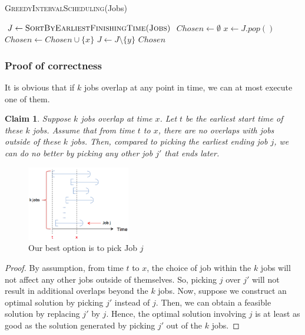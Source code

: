\documentclass[12pt, a4paper]{report}
\newtheorem{claim}{Claim}
\begin{document}
\begin{algorithm}[h!]
\begin{algorithmic}[1]
\caption{\textsc{GreedyIntervalScheduling}(Jobs)}
\label{alg:Greedy Interval Scheduling}
\STATE $J \leftarrow \textsc{SortByEarliestFinishingTime(Jobs)}$
\STATE $Chosen \leftarrow \emptyset$
	\STATE $x \leftarrow J.pop()$
	\STATE $Chosen \leftarrow Chosen \cup \{x\}$
			\STATE $J \leftarrow J \setminus \{y\}$
		\ENDIF
	\ENDFOR
\ENDWHILE
\RETURN $Chosen$
\end{algorithmic}
\end{algorithm}

\subsubsection{Proof of correctness}
It is obvious that if $k$ jobs overlap at any point in time, we can at most execute one of them.

\hspace{0pt}
\begin{claim}
Suppose $k$ jobs overlap at time $x$. Let $t$ be the earliest start time of these $k$ jobs. Assume that from time $t$ to $x$, there are no overlaps with jobs outside of these $k$ jobs. Then, compared to picking the earliest ending job $j$, we can do no better by picking any other job $j'$ that ends later.
\end{claim}

\begin{figure}[h!]
\centering
\includegraphics[width=0.4\textwidth]{../figures/claim1.png}
\caption{Our best option is to pick Job $j$}
\end{figure}

\begin{proof}
By assumption, from time $t$ to $x$, the choice of job within the $k$ jobs will not affect any other jobs outside of themselves. So, picking $j$ over $j'$ will not result in additional overlaps beyond the $k$ jobs. Now, suppose we construct an optimal solution by picking $j'$ instead of $j$. Then, we can obtain a feasible solution by replacing $j'$ by $j$. Hence, the optimal solution involving $j$ is at least as good as the solution generated by picking $j'$ out of the $k$ jobs.
\end{proof}
\end{document}
